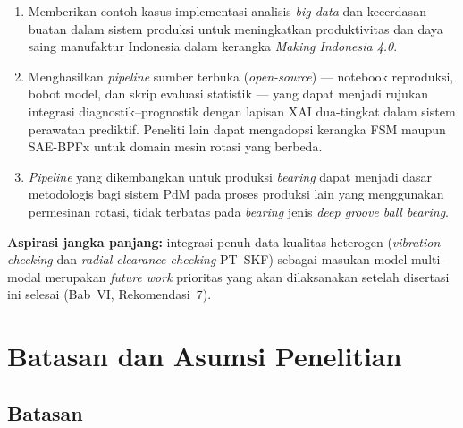 \begin{enumerate}
  \item Memberikan contoh kasus implementasi analisis \emph{big data}
        dan kecerdasan buatan dalam sistem produksi untuk meningkatkan
        produktivitas dan daya saing manufaktur Indonesia dalam
        kerangka \emph{Making Indonesia 4.0}.

  \item Menghasilkan \emph{pipeline} sumber terbuka (\emph{open-source})
        --- notebook reproduksi, bobot model, dan skrip evaluasi
        statistik --- yang dapat menjadi rujukan integrasi
        diagnostik–prognostik dengan lapisan XAI dua-tingkat dalam
        sistem perawatan prediktif.
        Peneliti lain dapat mengadopsi kerangka FSM maupun SAE-BPFx
        untuk domain mesin rotasi yang berbeda.

  \item \emph{Pipeline} yang dikembangkan untuk produksi \emph{bearing} dapat
        menjadi dasar metodologis bagi sistem PdM pada proses produksi
        lain yang menggunakan permesinan rotasi, tidak terbatas pada
        \emph{bearing} jenis \emph{deep groove ball bearing}.
\end{enumerate}

\textbf{Aspirasi jangka panjang:} integrasi penuh data kualitas
heterogen (\emph{vibration checking} dan \emph{radial clearance
checking} PT~SKF) sebagai masukan model multi-modal merupakan
\emph{future work} prioritas yang akan dilaksanakan setelah disertasi
ini selesai (Bab~VI, Rekomendasi~7).


\section{Batasan dan Asumsi Penelitian}
\label{sec:bab1_batasan}

\subsection*{Batasan}

